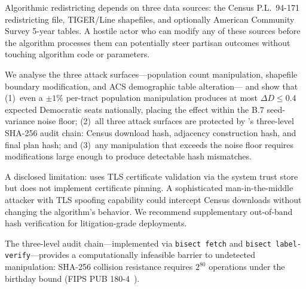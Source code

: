 Algorithmic redistricting depends on three data sources: the Census
P.L.\ 94-171 redistricting file, TIGER/Line shapefiles, and optionally
American Community Survey 5-year tables.
A hostile actor who can modify any of these sources before the algorithm
processes them can potentially steer partisan outcomes without touching
algorithm code or parameters.

We analyse the three attack surfaces---population count manipulation,
shapefile boundary modification, and ACS demographic table alteration---
and show that (1)~even a $\pm 1\%$ per-tract population manipulation
produces at most $\Delta D \leq 0.4$ expected Democratic seats nationally,
placing the effect within the B.7 seed-variance noise floor;
(2)~all three attack surfaces are protected by \bisect{}'s three-level
SHA-256 audit chain: Census download hash, adjacency construction hash,
and final plan hash; and (3)~any manipulation that exceeds the noise floor
requires modifications large enough to produce detectable hash mismatches.

A disclosed limitation: \bisect{} uses TLS certificate validation via
the system trust store but does not implement certificate pinning.
A sophisticated man-in-the-middle attacker with TLS spoofing capability
could intercept Census downloads without changing the algorithm's behavior.
We recommend supplementary out-of-band hash verification for litigation-grade deployments.

The three-level audit chain---implemented via \texttt{bisect fetch}
and \texttt{bisect label-verify}---provides a computationally infeasible
barrier to undetected manipulation: SHA-256 collision resistance
requires $2^{80}$ operations under the birthday bound
(FIPS PUB 180-4~\citep{fips180}).
